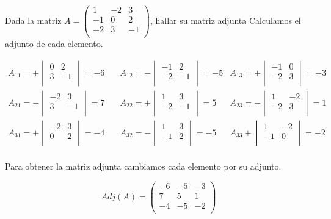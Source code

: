 \begin{ejemplo}
Dada la matriz $A=\begin{pmatrix} 
 1& -2& 3 \\
 -1& 0& 2 \\
 -2& 3& -1 \\
\end{pmatrix}$, hallar su matriz adjunta
\tcblower
Calculamos el adjunto de cada elemento.

\[
\begin{aligned}
A_{11}= + \begin{vmatrix} 0& 2 \\ 3& -1 \\ \end{vmatrix} =   -6 \quad & 
A_{12}= - \begin{vmatrix} -1& 2 \\ -2& -1 \\ \end{vmatrix} =   -5 & 
A_{13}=  + \begin{vmatrix} -1& 0 \\ -2& 3 \\ \end{vmatrix} =   -3 \\
A_{21}= - \begin{vmatrix} -2& 3 \\ 3& -1 \\ \end{vmatrix} =   7 \quad &  
A_{22}= + \begin{vmatrix} 1& 3 \\ -2& -1 \\ \end{vmatrix} =   5 &  
A_{23}= - \begin{vmatrix} 1& -2 \\ -2& 3 \\ \end{vmatrix} =   1 \\
A_{31}= + \begin{vmatrix} -2& 3 \\ 0& 2 \\ \end{vmatrix} =   -4 \quad &
A_{32}=- \begin{vmatrix} 1& 3 \\ -1& 2 \\ \end{vmatrix} =   -5 &
A_{33} + \begin{vmatrix} 1& -2 \\ -1& 0 \\ \end{vmatrix} =   -2 \\
\end{aligned}
\]

Para obtener la matriz adjunta cambiamos cada elemento por su adjunto.

\[
Adj(A)=
\begin{pmatrix}
  -6 &  -5  &  -3 \\
  7 &  5&  1 \\
  -4&  -5&  -2 \\
\end{pmatrix}
\]
\end{ejemplo}



